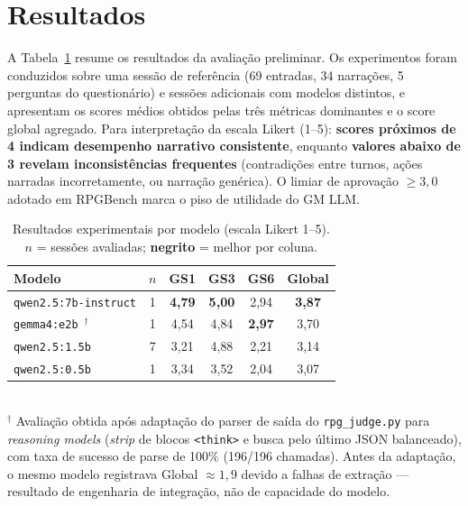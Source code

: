 \documentclass[12pt]{article}
\begin{document}
\section{Resultados}

A Tabela~\ref{tab:resultados} resume os resultados da avaliação preliminar. Os experimentos foram conduzidos sobre uma sessão de referência (69 entradas, 34 narrações, 5 perguntas do questionário) e sessões adicionais com modelos distintos, e apresentam os scores médios obtidos pelas três métricas dominantes e o score global agregado. Para interpretação da escala Likert (1--5): \textbf{scores próximos de 4 indicam desempenho narrativo consistente}, enquanto \textbf{valores abaixo de 3 revelam inconsistências frequentes} (contradições entre turnos, ações narradas incorretamente, ou narração genérica). O limiar de aprovação $\geq 3{,}0$ adotado em RPGBench \cite{yu:2025} marca o piso de utilidade do GM LLM.

\begin{table}[ht]
\centering
\caption{Resultados experimentais por modelo (escala Likert 1--5). $n$ = sessões avaliadas; \textbf{negrito} = melhor por coluna.}
\label{tab:resultados}
\small
\begin{tabular}{lccccc}
\toprule
\textbf{Modelo} & $n$ & \textbf{GS1} & \textbf{GS3} & \textbf{GS6} & \textbf{Global} \\
\midrule
\texttt{qwen2.5:7b-instruct}                           & 1 & \textbf{4{,}79} & \textbf{5{,}00} & 2{,}94          & \textbf{3{,}87} \\
\texttt{gemma4:e2b}~$^{\dagger}$ \cite{deepmind:gemma4:2026} & 1 & 4{,}54          & 4{,}84          & \textbf{2{,}97} & 3{,}70          \\
\texttt{qwen2.5:1.5b}                                  & 7 & 3{,}21          & 4{,}88          & 2{,}21          & 3{,}14          \\
\texttt{qwen2.5:0.5b}                                  & 1 & 3{,}34          & 3{,}52          & 2{,}04          & 3{,}07          \\
\bottomrule
\end{tabular}
\\[2pt]
{\footnotesize $^{\dagger}$ Avaliação obtida após adaptação do parser de saída do \texttt{rpg\_judge.py} para \textit{reasoning models} (\textit{strip} de blocos \texttt{<think>} e busca pelo último JSON balanceado), com taxa de sucesso de parse de 100\% (196/196 chamadas). Antes da adaptação, o mesmo modelo registrava Global $\approx 1{,}9$ devido a falhas de extração --- resultado de engenharia de integração, não de capacidade do modelo.}
\end{table}
\end{document}
